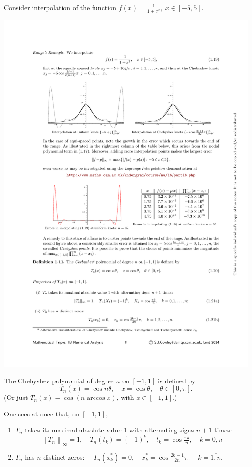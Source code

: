 \documentclass[a4paper]{article}
\begin{document}
\begin{example}
    Consider interpolation of the function $\displaystyle f(x) = \frac{1}{1+x^2},\ x\in [-5,5]$. 
    \begin{center}
        \includegraphics[scale=.85]{NA1}
    \end{center}
\end{example}

\begin{definition}
    The Chebyshev polynomial of degree $n$ on $[-1,1]$ is defined by
    \[
    T_n(x)=\cos n \theta, \quad x=\cos \theta, \quad \theta \in[0, \pi] .
    \]
    (Or just $T_n(x)=\cos (n \arccos x)$, with $x \in[-1,1]$.)
\end{definition}

One sees at once that, on $[-1,1]$,
\begin{enumerate}
    \item  $T_n$ takes its maximal absolute value 1 with alternating signs $n+1$ times:
    \[
    \left\|T_n\right\|_{\infty}=1, \quad T_n\left(t_k\right)=(-1)^k, \quad t_k=\cos \tfrac{\pi k}{n}, \quad k=\overline{0, n}
    \]
    \item $T_n$ has $n$ distinct zeros: $\quad T_n\left(x_k^*\right)=0, \quad x_k^*=\cos \frac{2 k-1}{2 n} \pi, \quad k=\overline{1, n}$.
\end{enumerate}
\end{document}
